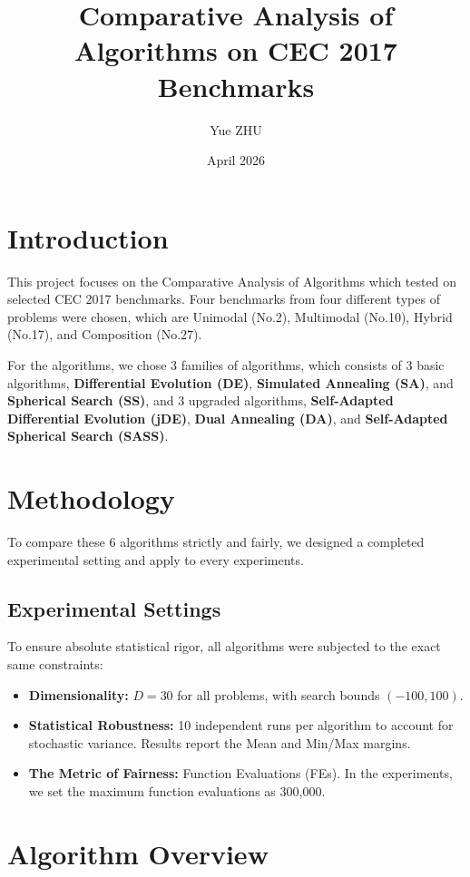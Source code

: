 \documentclass{article}
\title{Comparative Analysis of Algorithms on CEC 2017 Benchmarks}
\author{Yue ZHU}
\date{April 2026}
\begin{document}
\maketitle

\section{Introduction}

This project focuses on the Comparative Analysis of Algorithms which tested on selected CEC 2017 benchmarks. Four benchmarks from four different types of problems were chosen, which are Unimodal (No.2), Multimodal (No.10), Hybrid (No.17), and Composition (No.27). 

For the algorithms, we chose 3 families of algorithms, which consists of 3 basic algorithms, \textbf{Differential Evolution (DE)}, \textbf{Simulated Annealing (SA)}, and \textbf{Spherical Search (SS)}, and 3 upgraded algorithms, \textbf{Self-Adapted Differential Evolution (jDE)}, \textbf{Dual Annealing (DA)}, and \textbf{Self-Adapted Spherical Search (SASS)}.

\section{Methodology}

To compare these 6 algorithms strictly and fairly, we designed a completed experimental setting and apply to every experiments. 

\subsection{Experimental Settings}

To ensure absolute statistical rigor, all algorithms were subjected to the exact same constraints:

\begin{itemize}
    \item \textbf{Dimensionality:} $D = 30$ for all problems, with search bounds $(-100, 100)$.
    \item \textbf{Statistical Robustness:} 10 independent runs per algorithm to account for stochastic variance. Results report the Mean and Min/Max margins.
    \item \textbf{The Metric of Fairness:} Function Evaluations (FEs). In the experiments, we set the maximum function evaluations as 300,000.
\end{itemize}

\section{Algorithm Overview}
\end{document}
